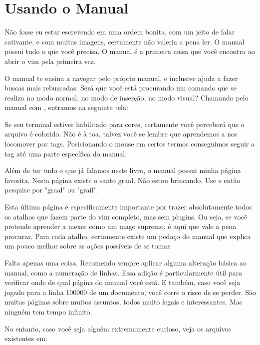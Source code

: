 \chapter{Usando o Manual}
Não fosse eu estar escrevendo em uma ordem bonita, com um jeito de falar cativante,
e com muitas imagens, certamente não valeria a pena ler.
O manual possui tudo o que você precisa.
O manual é a primeira coisa que você encontra ao abrir o vim pela primeira vez.


O manual te ensina a navegar pelo próprio manual, e inclusive ajuda a fazer buscas mais rebuscadas.
Será que você está procurando um comando que se realiza no modo normal, no modo de inserção, no modo visual?
Chamando pelo manual com , entramos na seguinte tela:


Se seu terminal estiver habilitado para cores, certamente você perceberá que o arquivo é colorido.
Não é à toa, talvez você se lembre que aprendemos a nos locomover por tags.
Posicionando o mouse em certos termos conseguimos seguir a tag até uma parte específica do manual.

Além de ter tudo o que já falamos neste livro, o manual possui minha página favorita.
Nesta página existe o santo graal.
Não estou brincando.
Use  e então pesquise por "graal" ou "grail".

Esta última página é especificamente importante por trazer absolutamente todos os atalhos que fazem
parte do vim completo, mas sem plugins.
Ou seja, se você pretende aprender a mexer como um mago supremo, é aqui que vale a pena procurar.
Para cada atalho, certamente existe um pedaço do manual que explica um pouco melhor sobre as ações possíveis de se tomar.

Falta apenas uma coisa. Recomendo sempre aplicar alguma alteração básica ao manual, como a numeração de linhas.
Essa adição é particularmente útil para verificar onde de qual página do manual você está.
E também, caso você seja jogado para a linha 100000 de um documento, você corre o risco de se perder.
São muitas páginas sobre muitos assuntos, todos muito legais e interessantes.
Mas ninguém tem tempo infinito.

No entanto, caso você seja alguém extremamente curioso, veja os arquivos existentes em:

